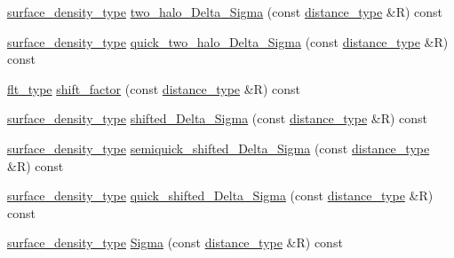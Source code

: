 \begin{DoxyCompactItemize}
\item 
\hyperlink{namespaceIceBRG_a80c597ef5ba0a32491d32a9f0083b02d}{surface\+\_\+density\+\_\+type} \hyperlink{classIceBRG_1_1lensing__profile__extension_a43b6010d594f6462480b8e8c58d5234e}{two\+\_\+halo\+\_\+\+Delta\+\_\+\+Sigma} (const \hyperlink{namespaceIceBRG_a45499647eb87e24c10ab32c628711cec}{distance\+\_\+type} \&R) const 
\item 
\hyperlink{namespaceIceBRG_a80c597ef5ba0a32491d32a9f0083b02d}{surface\+\_\+density\+\_\+type} \hyperlink{classIceBRG_1_1lensing__profile__extension_a895df13fa395114d05376c89cf60f61f}{quick\+\_\+two\+\_\+halo\+\_\+\+Delta\+\_\+\+Sigma} (const \hyperlink{namespaceIceBRG_a45499647eb87e24c10ab32c628711cec}{distance\+\_\+type} \&R) const 
\item 
\hyperlink{lib_2IceBRG__main_2common_8h_ad0f130a56eeb944d9ef2692ee881ecc4}{flt\+\_\+type} \hyperlink{classIceBRG_1_1lensing__profile__extension_a63a6825b6bd340976734cc6b89a4752a}{shift\+\_\+factor} (const \hyperlink{namespaceIceBRG_a45499647eb87e24c10ab32c628711cec}{distance\+\_\+type} \&R) const 
\item 
\hyperlink{namespaceIceBRG_a80c597ef5ba0a32491d32a9f0083b02d}{surface\+\_\+density\+\_\+type} \hyperlink{classIceBRG_1_1lensing__profile__extension_a1542f499631c589f28973b78eff4d322}{shifted\+\_\+\+Delta\+\_\+\+Sigma} (const \hyperlink{namespaceIceBRG_a45499647eb87e24c10ab32c628711cec}{distance\+\_\+type} \&R) const 
\item 
\hyperlink{namespaceIceBRG_a80c597ef5ba0a32491d32a9f0083b02d}{surface\+\_\+density\+\_\+type} \hyperlink{classIceBRG_1_1lensing__profile__extension_a444e4cc3923b1d0daa38bc07afcaf17e}{semiquick\+\_\+shifted\+\_\+\+Delta\+\_\+\+Sigma} (const \hyperlink{namespaceIceBRG_a45499647eb87e24c10ab32c628711cec}{distance\+\_\+type} \&R) const 
\item 
\hyperlink{namespaceIceBRG_a80c597ef5ba0a32491d32a9f0083b02d}{surface\+\_\+density\+\_\+type} \hyperlink{classIceBRG_1_1lensing__profile__extension_a76221dfb28d6c796f22e8b33a1fa3076}{quick\+\_\+shifted\+\_\+\+Delta\+\_\+\+Sigma} (const \hyperlink{namespaceIceBRG_a45499647eb87e24c10ab32c628711cec}{distance\+\_\+type} \&R) const 
\item 
\hyperlink{namespaceIceBRG_a80c597ef5ba0a32491d32a9f0083b02d}{surface\+\_\+density\+\_\+type} \hyperlink{classIceBRG_1_1lensing__profile__extension_a487fb1100188df2406f850327621560f}{Sigma} (const \hyperlink{namespaceIceBRG_a45499647eb87e24c10ab32c628711cec}{distance\+\_\+type} \&R) const 
\item 

\end{DoxyCompactItemize}
